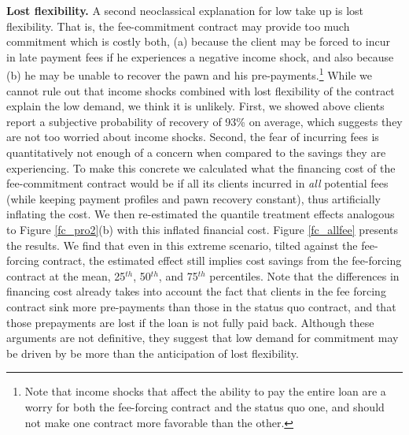 \documentclass[11pt]{article}
\begin{document}
\vspace{.1in}
\noindent \textbf{Lost flexibility.} A second neoclassical explanation for low take up is lost flexibility. That is, the fee-commitment contract may provide too much commitment which is costly both, (a) because the client may be forced to incur in late payment fees if he experiences a negative income shock, and also because (b) he may be unable to recover the pawn and his pre-payments.\footnote{Note that income shocks that affect the ability to pay the entire loan are a worry for both the fee-forcing contract and the status quo one, and should not make one contract more favorable than the other.} While we cannot rule out that income shocks combined with lost flexibility of the contract explain the low demand, we think it is unlikely. First, we showed above clients report a subjective probability of recovery of 93\% on average, which suggests they are not too worried about income shocks. Second, the fear of incurring fees is quantitatively not enough of a concern when compared to the savings they are experiencing. %
To make this concrete we calculated what the financing cost of the fee-commitment contract would be if all its clients incurred in \textit{all} potential fees (while keeping payment profiles and pawn recovery constant), thus artificially inflating the cost. We then re-estimated the quantile treatment effects analogous to Figure \ref{fc_pro2}(b) with this inflated financial cost. %
Figure \ref{fc_allfee} presents the results. We find that even in this extreme scenario, tilted against the fee-forcing contract, the estimated effect still implies cost savings from the fee-forcing contract at the mean, 25$^{th}$, 50$^{th}$, and 75$^{th}$ percentiles. Note that the differences in financing cost already takes into account the fact that clients in the fee forcing contract sink more pre-payments than those in the status quo contract, and that those prepayments are lost if the loan is not fully paid back.  Although these arguments are not definitive, they suggest that low demand for commitment may be driven by be more than the anticipation of lost flexibility.
\end{document}
